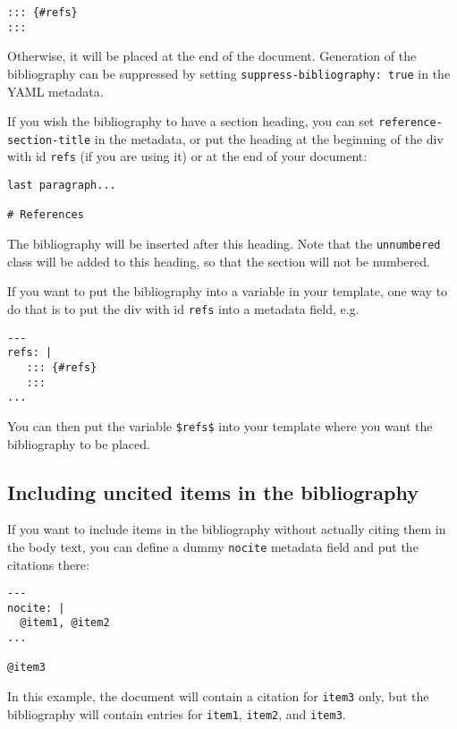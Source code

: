 \documentclass[
  a4paper,
]{article}
\begin{document}
\begin{verbatim}
::: {#refs}
:::
\end{verbatim}

Otherwise, it will be placed at the end of the document. Generation of
the bibliography can be suppressed by setting
\texttt{suppress-bibliography:\ true} in the YAML metadata.

If you wish the bibliography to have a section heading, you can set
\texttt{reference-section-title} in the metadata, or put the heading at
the beginning of the div with id \texttt{refs} (if you are using it) or
at the end of your document:

\begin{verbatim}
last paragraph...

# References
\end{verbatim}

The bibliography will be inserted after this heading. Note that the
\texttt{unnumbered} class will be added to this heading, so that the
section will not be numbered.

If you want to put the bibliography into a variable in your template,
one way to do that is to put the div with id \texttt{refs} into a
metadata field, e.g.

\begin{verbatim}
---
refs: |
   ::: {#refs}
   :::
...
\end{verbatim}

You can then put the variable \texttt{\$refs\$} into your template where
you want the bibliography to be placed.

\hypertarget{including-uncited-items-in-the-bibliography}{%
\subsection{Including uncited items in the
bibliography}\label{including-uncited-items-in-the-bibliography}}

If you want to include items in the bibliography without actually citing
them in the body text, you can define a dummy \texttt{nocite} metadata
field and put the citations there:

\begin{verbatim}
---
nocite: |
  @item1, @item2
...

@item3
\end{verbatim}

In this example, the document will contain a citation for \texttt{item3}
only, but the bibliography will contain entries for \texttt{item1},
\texttt{item2}, and \texttt{item3}.
\end{document}
